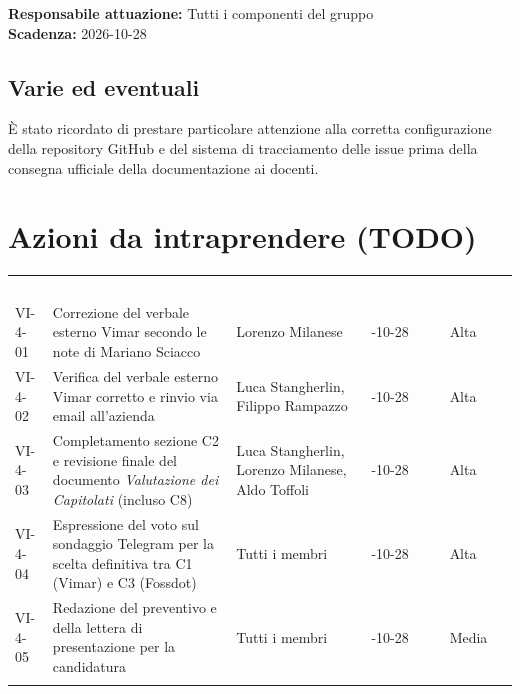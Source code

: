\documentclass[12pt,a4paper]{article}
\begin{document}
\textbf{Responsabile attuazione:} Tutti i componenti del gruppo \\
\textbf{Scadenza:} 2026-10-28

\hypertarget{varie-ed-eventuali}{%
\subsection{Varie ed eventuali}}
È stato ricordato di prestare particolare attenzione alla corretta configurazione della repository GitHub e del sistema di tracciamento delle issue prima della consegna ufficiale della documentazione ai docenti.

\hypertarget{azioni-da-intraprendere}{%
\section{Azioni da intraprendere (TODO)}}

\begin{center}
\begin{tabularx}{\linewidth}{>{\hsize=0.60\hsize\raggedright\arraybackslash}X>{\hsize=1.70\hsize\raggedright\arraybackslash}X>{\hsize=0.85\hsize\raggedright\arraybackslash}X>{\hsize=0.75\hsize\centering\arraybackslash}X>{\hsize=0.60\hsize\centering\arraybackslash}X}
\rowcolor{bfblue}\textcolor{white}{\textbf{ID}} & \textcolor{white}{\textbf{Descrizione}} & \textcolor{white}{\textbf{Responsabile}} & \textcolor{white}{\textbf{Scadenza}} & \textcolor{white}{\textbf{Priorità}} \\
VI-4-01 & Correzione del verbale esterno Vimar secondo le note di Mariano Sciacco & Lorenzo Milanese & 2026-10-28 & Alta \\ \arrayrulecolor{bfline}\hline
VI-4-02 & Verifica del verbale esterno Vimar corretto e rinvio via email all'azienda & Luca Stangherlin, Filippo Rampazzo & 2026-10-28 & Alta \\ \arrayrulecolor{bfline}\hline
VI-4-03 & Completamento sezione C2 e revisione finale del documento \emph{Valutazione dei Capitolati} (incluso C8) & Luca Stangherlin, Lorenzo Milanese, Aldo Toffoli & 2026-10-28 & Alta \\ \arrayrulecolor{bfline}\hline
VI-4-04 & Espressione del voto sul sondaggio Telegram per la scelta definitiva tra C1 (Vimar) e C3 (Fossdot) & Tutti i membri & 2026-10-28 & Alta \\ \arrayrulecolor{bfline}\hline
VI-4-05 & Redazione del preventivo e della lettera di presentazione per la candidatura & Tutti i membri & 2026-10-28 & Media \\ \arrayrulecolor{bfline}\hline
\end{tabularx}
\end{center}
\end{document}
